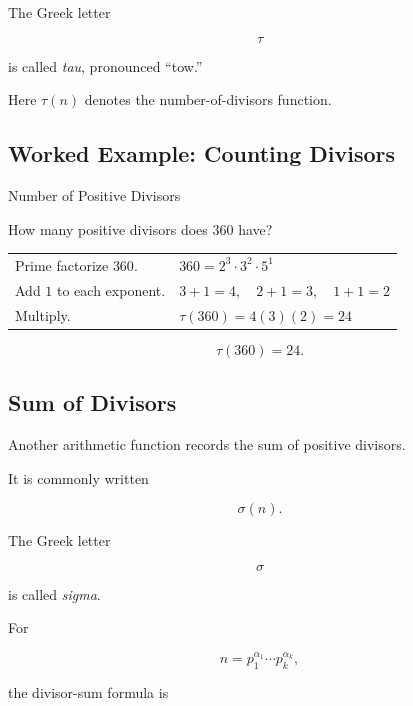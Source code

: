 The Greek letter

\[ \tau \]

is called \emph{tau}, pronounced ``tow.''

Here \(\tau(n)\) denotes the number-of-divisors function.

\subsection{Worked Example: Counting Divisors}
\label{subsec:worked-counting-divisors}

\begin{workedexamplebox}{Number of Positive Divisors}

How many positive divisors does \(360\) have?

\begin{tabularx}{\textwidth}{@{}>{\raggedright\arraybackslash}p{}X@{}}
Prime factorize \(360\). &
\(360=2^3\cdot3^2\cdot5^1\)\\
Add \(1\) to each exponent. &
\(3+1=4,\quad2+1=3,\quad1+1=2\)\\
Multiply. &
\(\tau(360)=4(3)(2)=24\)
\end{tabularx}

\begin{answerbox}
\[ \boxed{\tau(360)=24.} \]
\end{answerbox}
\end{workedexamplebox}

\subsection{Sum of Divisors}
\label{subsec:sum-divisors}

Another arithmetic function records the sum of positive divisors.

It is commonly written

\[ \sigma(n). \]

The Greek letter

\[ \sigma \]

is called \emph{sigma}.

For

\[ n=p_1^{\alpha_1}\cdots p_k^{\alpha_k}, \]

the divisor-sum formula is

